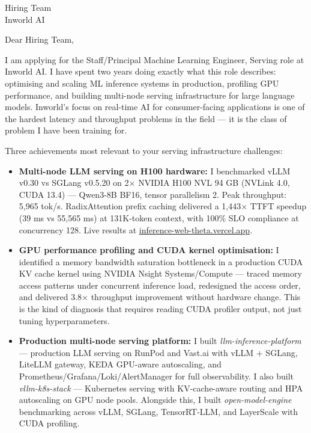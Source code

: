 \documentclass[12pt,a4paper]{letter}
\date{\today}
\begin{document}
\begin{letter}{Hiring Team \\ Inworld AI}

\opening{Dear Hiring Team,}

I am applying for the Staff/Principal Machine Learning Engineer, Serving role at Inworld AI. I have spent two years doing exactly what this role describes: optimising and scaling ML inference systems in production, profiling GPU performance, and building multi-node serving infrastructure for large language models. Inworld's focus on real-time AI for consumer-facing applications is one of the hardest latency and throughput problems in the field — it is the class of problem I have been training for.

Three achievements most relevant to your serving infrastructure challenges:

\begin{itemize}
  \item \textbf{Multi-node LLM serving on H100 hardware:} I benchmarked vLLM v0.30 vs SGLang v0.5.20 on 2$\times$ NVIDIA H100 NVL 94 GB (NVLink 4.0, CUDA 13.4) — Qwen3-8B BF16, tensor parallelism 2. Peak throughput: 5,965 tok/s. RadixAttention prefix caching delivered a 1,443$\times$ TTFT speedup (39 ms vs 55,565 ms) at 131K-token context, with 100\% SLO compliance at concurrency 128. Live results at \href{https://inference-web-theta.vercel.app/benchmarks/llm}{inference-web-theta.vercel.app}.

  \item \textbf{GPU performance profiling and CUDA kernel optimisation:} I identified a memory bandwidth saturation bottleneck in a production CUDA KV cache kernel using NVIDIA Nsight Systems/Compute — traced memory access patterns under concurrent inference load, redesigned the access order, and delivered 3.8$\times$ throughput improvement without hardware change. This is the kind of diagnosis that requires reading CUDA profiler output, not just tuning hyperparameters.

  \item \textbf{Production multi-node serving platform:} I built \textit{llm-inference-platform} — production LLM serving on RunPod and Vast.ai with vLLM + SGLang, LiteLLM gateway, KEDA GPU-aware autoscaling, and Prometheus/Grafana/Loki/AlertManager for full observability. I also built \textit{vllm-k8s-stack} — Kubernetes serving with KV-cache-aware routing and HPA autoscaling on GPU node pools. Alongside this, I built \textit{open-model-engine} benchmarking across vLLM, SGLang, TensorRT-LLM, and LayerScale with CUDA profiling.
\end{itemize}


\end{letter}
\end{document}
